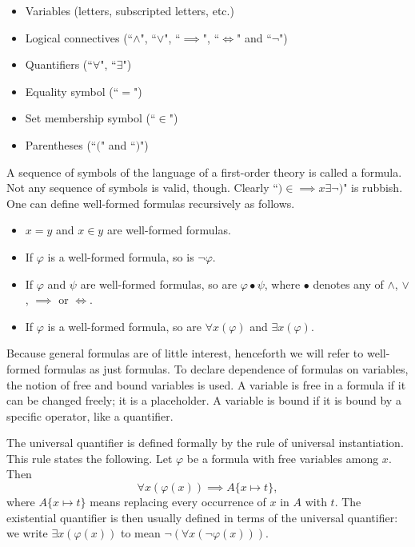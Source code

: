 \documentclass[../main.tex]{subfiles}
\begin{document}
\begin{itemize}
    \item Variables (letters, subscripted letters, etc.)
    \item Logical connectives (``$\land$", ``$\lor$", ``$\implies$", ``$\iff$" and ``$\lnot$")
    \item Quantifiers (``$\forall$", ``$\exists$")
    \item Equality symbol (``$=$")
    \item Set membership symbol (``$\in$")
    \item Parentheses (``$($" and ``$)$")
\end{itemize}
A sequence of symbols of the language of a first-order theory is called a formula. Not any sequence of symbols is valid, though. Clearly ``$)\in\implies x\exists\lnot)$" is rubbish. One can define well-formed formulas recursively as follows.
\begin{itemize}
    \item $x=y$ and $x\in y$ are well-formed formulas.
    \item If $\varphi$ is a well-formed formula, so is $\lnot\varphi$.
    \item If $\varphi$ and $\psi$ are well-formed formulas, so are $\varphi\mathrel{\bullet}\psi$, where $\bullet$ denotes any of $\land$, $\lor$, $\implies$ or $\iff$.
    \item If $\varphi$ is a well-formed formula, so are $\forall x(\varphi)$ and $\exists x(\varphi)$.
\end{itemize}
Because general formulas are of little interest, henceforth we will refer to well-formed formulas as just formulas. To declare dependence of formulas on variables, the notion of free and bound variables is used. A variable is free in a formula if it can be changed freely; it is a placeholder. A variable is bound if it is bound by a specific operator, like a quantifier.

The universal quantifier is defined formally by the rule of universal instantiation. This rule states the following. Let $\varphi$ be a formula with free variables among $x$. Then
\begin{equation*}
    \forall x(\varphi(x))\implies A\{x\mapsto t\},
\end{equation*}
where $A\{x\mapsto t\}$ means replacing every occurrence of $x$ in $A$ with $t$. The existential quantifier is then usually defined in terms of the universal quantifier: we write $\exists x(\varphi(x))$ to mean $\lnot(\forall x(\lnot\varphi(x)))$.
\end{document}
